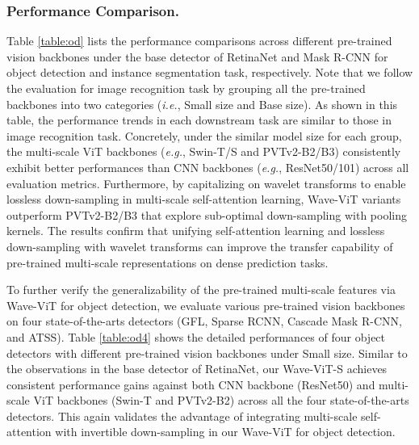 \documentclass[runningheads]{llncs}
\begin{document}
\subsubsection{Performance Comparison.}
Table \ref{table:od} lists the performance comparisons across different pre-trained vision backbones under the base detector of RetinaNet and Mask R-CNN for object detection and instance segmentation task, respectively. Note that we follow the evaluation for image recognition task by grouping all the pre-trained backbones into two categories (\emph{i.e.}, Small size and Base size). As shown in this table, the performance trends in each downstream task are similar to those in image recognition task. Concretely, under the similar model size for each group, the multi-scale ViT backbones (\emph{e.g.}, Swin-T/S and PVTv2-B2/B3) consistently exhibit better performances than CNN backbones (\emph{e.g.}, ResNet50/101) across all evaluation metrics. Furthermore, by capitalizing on wavelet transforms to enable lossless down-sampling in multi-scale self-attention learning, Wave-ViT variants outperform PVTv2-B2/B3 that explore sub-optimal down-sampling with pooling kernels. The results confirm that unifying self-attention learning and lossless down-sampling with wavelet transforms can improve the transfer capability of pre-trained multi-scale representations on dense prediction tasks.

To further verify the generalizability of the pre-trained multi-scale features via Wave-ViT for object detection, we evaluate various pre-trained vision backbones on four state-of-the-arts detectors (GFL, Sparse RCNN, Cascade Mask R-CNN, and ATSS). Table \ref{table:od4} shows the detailed performances of four object detectors with different pre-trained vision backbones under Small size. Similar to the observations in the base detector of RetinaNet, our Wave-ViT-S achieves consistent performance gains against both CNN backbone (ResNet50) and multi-scale ViT backbones (Swin-T and PVTv2-B2) across all the four state-of-the-arts detectors. This again validates the advantage of integrating multi-scale self-attention with invertible down-sampling in our Wave-ViT for object detection.
\end{document}

